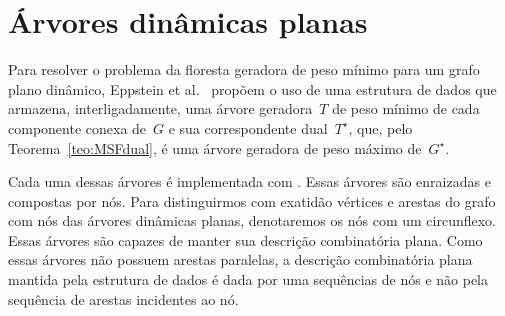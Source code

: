 \section{Árvores dinâmicas planas}
\label{sec:EODT}


Para resolver o problema da floresta geradora de peso mínimo para um grafo plano dinâmico, Eppstein et al.~\cite{EPPSTEIN-planar} propõem o uso de uma estrutura de dados que armazena, interligadamente, uma árvore geradora~$T$ de peso mínimo de cada componente conexa de~$G$ e sua correspondente dual~$T^\star$, que, pelo Teorema~\ref{teo:MSFdual}, é uma árvore geradora de peso máximo de~$G^\star$.


Cada uma dessas árvores é implementada com .
Essas árvores são enraizadas e compostas por nós.
Para distinguirmos com exatidão vértices e arestas do grafo com nós das árvores dinâmicas planas, denotaremos os nós com um circunflexo.
Essas árvores são capazes de manter sua descrição combinatória plana.
Como essas árvores não possuem arestas paralelas, a descrição combinatória plana mantida pela estrutura de dados é dada por uma sequências de nós e não pela sequência de arestas incidentes ao nó.


